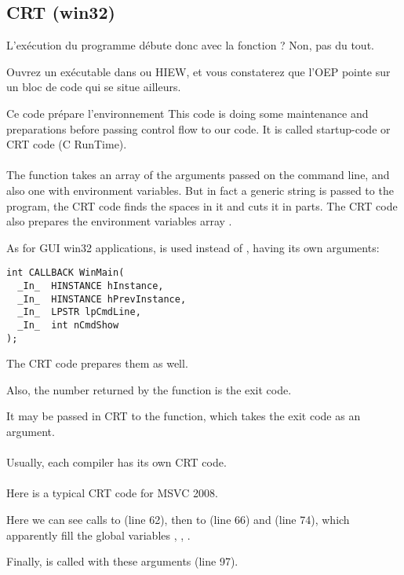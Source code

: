 ﻿\subsection{CRT (win32)}
\label{sec:CRT}

L'exécution du programme débute donc avec la fonction \main{}?
Non, pas du tout.

Ouvrez un exécutable dans \IDA ou HIEW, et vous constaterez que l'\ac{OEP} pointe sur un bloc de 
code qui se situe ailleurs.

Ce code prépare l'environnement 
This code is doing some maintenance and preparations before passing control flow to our code.
It is called startup-code or CRT code (C RunTime). \\
\\
The \main{} function takes an array of the arguments passed on the command line, and also
one with environment variables.
But in fact a generic string is passed to the program,
the CRT code finds the spaces in it and cuts it in parts.
The CRT code also prepares the environment
variables array .

As for \ac{GUI} win32 applications,  is used instead of \main{}, having its own arguments:

\begin{lstlisting}[style=customc]
int CALLBACK WinMain(
  _In_  HINSTANCE hInstance,
  _In_  HINSTANCE hPrevInstance,
  _In_  LPSTR lpCmdLine,
  _In_  int nCmdShow
);
\end{lstlisting}

The CRT code prepares them as well.

Also, the number returned by the \main{} function is the exit code.

It may be passed in CRT to the  function, which takes the exit code as an argument. \\
\\
Usually, each compiler has its own CRT code. \\
\\
Here is a typical CRT code for MSVC 2008.



Here we can see calls to  (line 62),
then to  (line 66) and  (line 74),
which apparently fill the global variables
, , .

Finally, \main{} is called with these arguments (line 97).

